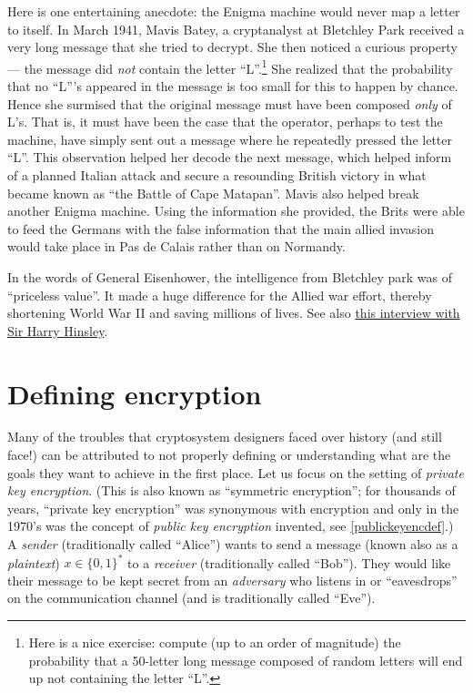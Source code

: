 Here is one entertaining anecdote: the Enigma machine would never map a
letter to itself. In March 1941, Mavis Batey, a cryptanalyst at
Bletchley Park received a very long message that she tried to decrypt.
She then noticed a curious property--- the message did \emph{not}
contain the letter ``L''.\footnote{Here is a nice exercise: compute (up
  to an order of magnitude) the probability that a 50-letter long
  message composed of random letters will end up not containing the
  letter ``L''.} She realized that the probability that no ``L'''s
appeared in the message is too small for this to happen by chance. Hence
she surmised that the original message must have been composed
\emph{only} of L's. That is, it must have been the case that the
operator, perhaps to test the machine, have simply sent out a message
where he repeatedly pressed the letter ``L''. This observation helped
her decode the next message, which helped inform of a planned Italian
attack and secure a resounding British victory in what became known as
``the Battle of Cape Matapan''. Mavis also helped break another Enigma
machine. Using the information she provided, the Brits were able to feed
the Germans with the false information that the main allied invasion
would take place in Pas de Calais rather than on Normandy.

In the words of General Eisenhower, the intelligence from Bletchley park
was of ``priceless value''. It made a huge difference for the Allied war
effort, thereby shortening World War II and saving millions of lives.
See also \href{http://www.cix.co.uk/~klockstone/hinsley.htm}{this
interview with Sir Harry Hinsley}.

\section{Defining encryption}\label{Defining-encryption}

Many of the troubles that cryptosystem designers faced over history (and
still face!) can be attributed to not properly defining or understanding
what are the goals they want to achieve in the first place. Let us focus
on the setting of \emph{private key encryption}. (This is also known as
``symmetric encryption''; for thousands of years, ``private key
encryption'' was synonymous with encryption and only in the 1970's was
the concept of \emph{public key encryption} invented, see
\cref{publickeyencdef}.) A \emph{sender} (traditionally called
``Alice'') wants to send a message (known also as a \emph{plaintext})
\(x\in \{0,1\}^*\) to a \emph{receiver} (traditionally called ``Bob'').
They would like their message to be kept secret from an \emph{adversary}
who listens in or ``eavesdrops'' on the communication channel (and is
traditionally called ``Eve'').

